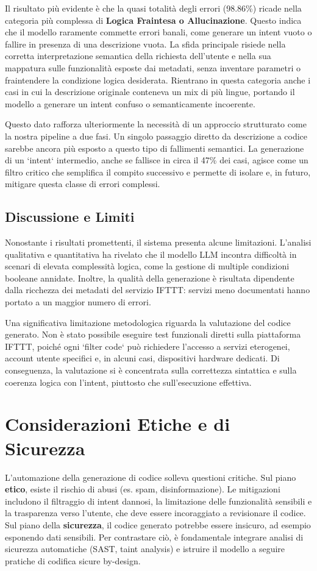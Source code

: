 \documentclass[sigconf,natbib=false]{acmart}
\begin{document}
Il risultato più evidente è che la quasi totalità degli errori (98.86\%) ricade nella categoria più complessa di \textbf{Logica Fraintesa o Allucinazione}. Questo indica che il modello raramente commette errori banali, come generare un intent vuoto o fallire in presenza di una descrizione vuota. La sfida principale risiede nella corretta interpretazione semantica della richiesta dell'utente e nella sua mappatura sulle funzionalità esposte dai metadati, senza inventare parametri o fraintendere la condizione logica desiderata. Rientrano in questa categoria anche i casi in cui la descrizione originale conteneva un mix di più lingue, portando il modello a generare un intent confuso o semanticamente incoerente.

Questo dato rafforza ulteriormente la necessità di un approccio strutturato come la nostra pipeline a due fasi. Un singolo passaggio diretto da descrizione a codice sarebbe ancora più esposto a questo tipo di fallimenti semantici. La generazione di un `intent` intermedio, anche se fallisce in circa il 47\% dei casi, agisce come un filtro critico che semplifica il compito successivo e permette di isolare e, in futuro, mitigare questa classe di errori complessi.

\subsection{Discussione e Limiti}
Nonostante i risultati promettenti, il sistema presenta alcune limitazioni. L'analisi qualitativa e quantitativa ha rivelato che il modello LLM incontra difficoltà in scenari di elevata complessità logica, come la gestione di multiple condizioni booleane annidate. Inoltre, la qualità della generazione è risultata dipendente dalla ricchezza dei metadati del servizio IFTTT: servizi meno documentati hanno portato a un maggior numero di errori.

Una significativa limitazione metodologica riguarda la valutazione del codice generato. Non è stato possibile eseguire test funzionali diretti sulla piattaforma IFTTT, poiché ogni `filter code` può richiedere l'accesso a servizi eterogenei, account utente specifici e, in alcuni casi, dispositivi hardware dedicati. Di conseguenza, la valutazione si è concentrata sulla correttezza sintattica e sulla coerenza logica con l'intent, piuttosto che sull'esecuzione effettiva.

\section{Considerazioni Etiche e di Sicurezza}
L'automazione della generazione di codice solleva questioni critiche. Sul piano \textbf{etico}, esiste il rischio di abusi (es. spam, disinformazione). Le mitigazioni includono il filtraggio di intent dannosi, la limitazione delle funzionalità sensibili e la trasparenza verso l'utente, che deve essere incoraggiato a revisionare il codice. Sul piano della \textbf{sicurezza}, il codice generato potrebbe essere insicuro, ad esempio esponendo dati sensibili. Per contrastare ciò, è fondamentale integrare analisi di sicurezza automatiche (SAST, taint analysis) e istruire il modello a seguire pratiche di codifica sicure by-design.
\end{document}
